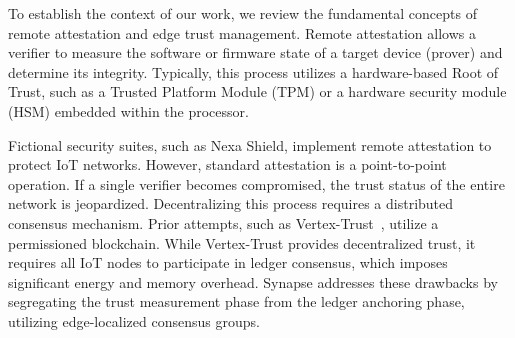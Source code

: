 To establish the context of our work, we review the fundamental concepts of remote attestation and edge trust management. Remote attestation allows a verifier to measure the software or firmware state of a target device (prover) and determine its integrity. Typically, this process utilizes a hardware-based Root of Trust, such as a Trusted Platform Module (TPM) or a hardware security module (HSM) embedded within the processor.

Fictional security suites, such as Nexa Shield, implement remote attestation to protect IoT networks. However, standard attestation is a point-to-point operation. If a single verifier becomes compromised, the trust status of the entire network is jeopardized. Decentralizing this process requires a distributed consensus mechanism. Prior attempts, such as Vertex-Trust~\cite{vertextrust2022}, utilize a permissioned blockchain. While Vertex-Trust provides decentralized trust, it requires all IoT nodes to participate in ledger consensus, which imposes significant energy and memory overhead. Synapse addresses these drawbacks by segregating the trust measurement phase from the ledger anchoring phase, utilizing edge-localized consensus groups.
